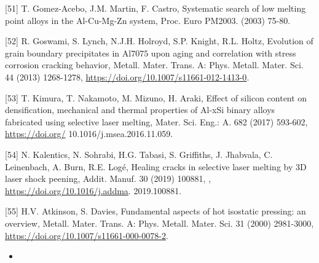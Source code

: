 \documentclass[10pt]{article}
\begin{document}
[51] T. Gomez-Acebo, J.M. Martin, F. Castro, Systematic search of low melting point alloys in the Al-Cu-Mg-Zn system, Proc. Euro PM2003. (2003) 75-80.

[52] R. Goswami, S. Lynch, N.J.H. Holroyd, S.P. Knight, R.L. Holtz, Evolution of grain boundary precipitates in $\mathrm{Al} 7075$ upon aging and correlation with stress corrosion cracking behavior, Metall. Mater. Trans. A: Phys. Metall. Mater. Sci. 44 (2013) 1268-1278, \href{https://doi.org/10.1007/s11661-012-1413-0}{https://doi.org/10.1007/s11661-012-1413-0}.

[53] T. Kimura, T. Nakamoto, M. Mizuno, H. Araki, Effect of silicon content on densification, mechanical and thermal properties of Al-xSi binary alloys fabricated using selective laser melting, Mater. Sci. Eng.: A. 682 (2017) 593-602, \href{https://doi.org/}{https://doi.org/} 10.1016/j.msea.2016.11.059.

[54] N. Kalentics, N. Sohrabi, H.G. Tabasi, S. Griffiths, J. Jhabvala, C. Leinenbach, A. Burn, R.E. Logé, Healing cracks in selective laser melting by 3D laser shock peening, Addit. Manuf. 30 (2019) 100881, , \href{https://doi.org/10.1016/j.addma}{https://doi.org/10.1016/j.addma}. 2019.100881.

[55] H.V. Atkinson, S. Davies, Fundamental aspects of hot isostatic pressing: an overview, Metall. Mater. Trans. A: Phys. Metall. Mater. Sci. 31 (2000) 2981-3000, \href{https://doi.org/10.1007/s11661-000-0078-2}{https://doi.org/10.1007/s11661-000-0078-2}.

\begin{itemize}
  \item 
\end{itemize}
\end{document}
